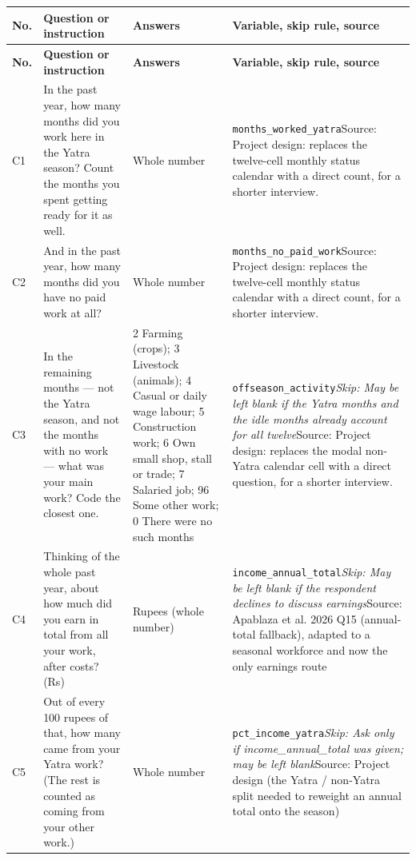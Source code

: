 \documentclass[10pt]{article}
\begin{document}
{\scriptsize
\begin{longtable}{p{0.8cm}p{6.4cm}p{3.6cm}p{5.8cm}}
\toprule
\textbf{No.} & \textbf{Question or instruction} & \textbf{Answers} & \textbf{Variable, skip rule, source} \\
\midrule
\endfirsthead
\toprule
\textbf{No.} & \textbf{Question or instruction} & \textbf{Answers} & \textbf{Variable, skip rule, source} \\
\midrule
\endhead
C1 & In the past year, how many months did you work here in the Yatra season? Count the months you spent getting ready for it as well. & Whole number & \texttt{months\_worked\_yatra}\newline Source: Project design: replaces the twelve-cell monthly status calendar with a direct count, for a shorter interview. \\
C2 & And in the past year, how many months did you have no paid work at all? & Whole number & \texttt{months\_no\_paid\_work}\newline Source: Project design: replaces the twelve-cell monthly status calendar with a direct count, for a shorter interview. \\
C3 & In the remaining months — not the Yatra season, and not the months with no work — what was your main work? Code the closest one. & 2 Farming (crops); 3 Livestock (animals); 4 Casual or daily wage labour; 5 Construction work; 6 Own small shop, stall or trade; 7 Salaried job; 96 Some other work; 0 There were no such months & \texttt{offseason\_activity}\newline \textit{Skip: May be left blank if the Yatra months and the idle months already account for all twelve}\newline Source: Project design: replaces the modal non-Yatra calendar cell with a direct question, for a shorter interview. \\
C4 & Thinking of the whole past year, about how much did you earn in total from all your work, after costs? (Rs) & Rupees (whole number) & \texttt{income\_annual\_total}\newline \textit{Skip: May be left blank if the respondent declines to discuss earnings}\newline Source: Apablaza et al. 2026 Q15 (annual-total fallback), adapted to a seasonal workforce and now the only earnings route \\
C5 & Out of every 100 rupees of that, how many came from your Yatra work? (The rest is counted as coming from your other work.) & Whole number & \texttt{pct\_income\_yatra}\newline \textit{Skip: Ask only if income\_annual\_total was given; may be left blank}\newline Source: Project design (the Yatra / non-Yatra split needed to reweight an annual total onto the season) \\

\end{longtable}}
\end{document}
